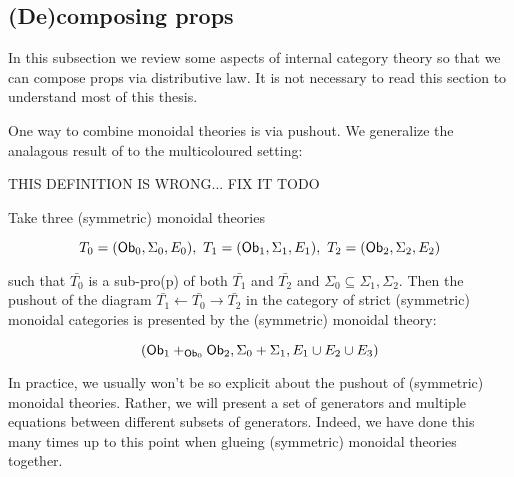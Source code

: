 

\subsection{(De)composing props}
\label{subsec:internal}
%
%
%
%
%
%
%



In this subsection we review some aspects of internal category theory so that we can compose props via distributive law.  It is not necessary to read this section to understand most of this thesis.






One way to combine monoidal theories is via pushout.  We generalize the analagous result of \cite[Proposition 2.51]{ih} to the multicoloured setting:

THIS DEFINITION IS WRONG... FIX IT TODO
\begin{lemma}
Take three (symmetric) monoidal theories

$$T_0=({\sf Ob}_0,\Sigma_0 ,E_0 ), \ T_1=({\sf Ob}_1,\Sigma_1 ,E_1 ), \ T_2=({\sf Ob}_2,\Sigma_2 ,E_2 )$$

such that $\bar{T_0}$ is a sub-pro(p) of both $\bar{T_1}$ and $\bar{T_2}$ and $\Sigma_0 \subseteq \Sigma_1,\Sigma_2$.
Then the pushout of the diagram $\bar{T_1} \leftarrow \bar{T_0} \rightarrow \bar{T_2}$  in the category of strict (symmetric) monoidal categories is presented by the (symmetric) monoidal theory:

$$
( {\sf Ob}_1 +_{{\sf Ob}_0} {\sf Ob}_2, \Sigma_0+\Sigma_1, E_1 \cup E_2 \cup E_3 )
$$

\end{lemma}

In practice, we usually won't be so explicit about the pushout of (symmetric) monoidal theories.  Rather, we will present a set of generators and multiple equations between different subsets of generators.  Indeed, we have done this many times up to this point when glueing (symmetric) monoidal theories together.  



